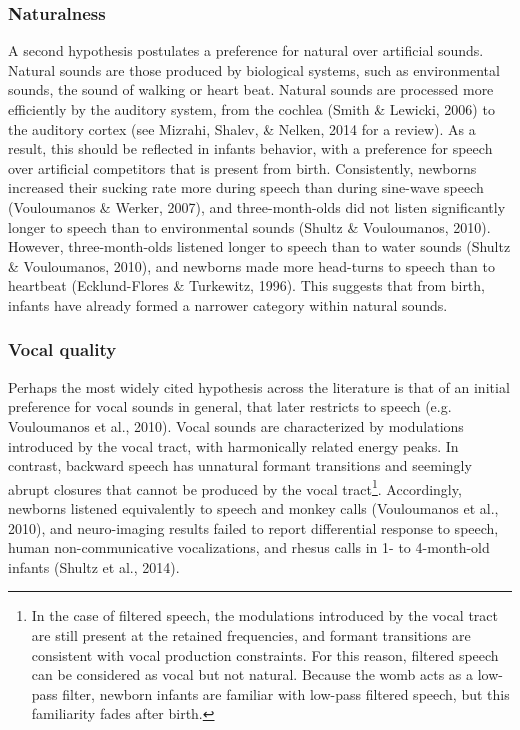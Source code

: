 \documentclass[man]{apa6}
\let\rmarkdownfootnote\footnote%
\def\footnote{\protect\rmarkdownfootnote}
\begin{document}
\subsubsection{Naturalness}\label{naturalness}

A second hypothesis postulates a preference for natural over artificial
sounds. Natural sounds are those produced by biological systems, such as
environmental sounds, the sound of walking or heart beat. Natural sounds
are processed more efficiently by the auditory system, from the cochlea
(Smith \& Lewicki, 2006) to the auditory cortex (see Mizrahi, Shalev, \&
Nelken, 2014 for a review). As a result, this should be reflected in
infants behavior, with a preference for speech over artificial
competitors that is present from birth. Consistently, newborns increased
their sucking rate more during speech than during sine-wave speech
(Vouloumanos \& Werker, 2007), and three-month-olds did not listen
significantly longer to speech than to environmental sounds (Shultz \&
Vouloumanos, 2010). However, three-month-olds listened longer to speech
than to water sounds (Shultz \& Vouloumanos, 2010), and newborns made
more head-turns to speech than to heartbeat (Ecklund-Flores \&
Turkewitz, 1996). This suggests that from birth, infants have already
formed a narrower category within natural sounds.

\subsubsection{Vocal quality}\label{vocal-quality}

Perhaps the most widely cited hypothesis across the literature is that
of an initial preference for vocal sounds in general, that later
restricts to speech (e.g. Vouloumanos et al., 2010). Vocal sounds are
characterized by modulations introduced by the vocal tract, with
harmonically related energy peaks. In contrast, backward speech has
unnatural formant transitions and seemingly abrupt closures that cannot
be produced by the vocal tract\footnote{In the case of filtered speech,
  the modulations introduced by the vocal tract are still present at the
  retained frequencies, and formant transitions are consistent with
  vocal production constraints. For this reason, filtered speech can be
  considered as vocal but not natural. Because the womb acts as a
  low-pass filter, newborn infants are familiar with low-pass filtered
  speech, but this familiarity fades after birth.}. Accordingly,
newborns listened equivalently to speech and monkey calls (Vouloumanos
et al., 2010), and neuro-imaging results failed to report differential
response to speech, human non-communicative vocalizations, and rhesus
calls in 1- to 4-month-old infants (Shultz et al., 2014).
\end{document}
